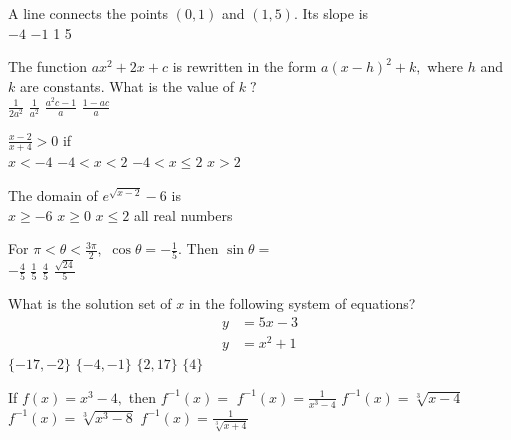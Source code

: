 \begin{question}
A line connects the points \((0, 1)\) and \((1, 5).\) Its slope is \\
\choicesline
{\(-4\)}
{\(-1\)}
{1}
{}
{5}
\end{question}

\begin{question}
The function \(ax^2 + 2x + c\) is rewritten in the form \(a(x - h)^2 + k,\) where \(h\) and \(k\) are constants. What is the value of \(k \; ?\) \\
\choicesline
{\(\frac{1}{2a^2}\)}
{\(\frac{1}{a^2}\)}
{}
{\(\frac{a^2 c - 1}{a}\)}
{\(\frac{1 - ac}{a}\)}
\end{question}

\begin{question}
\(\frac{x - 2}{x + 4} > 0\) if \\
\choices
{\(x < -4\)}
{\(-4 < x < 2\)}
{\(-4 < x \leqslant 2\)}
{\(x > 2\)}
{}    
\end{question}

\begin{question} 
The domain of \(e^{\sqrt{x - 2}} - 6\) is \\
\choices
{\(x \geqslant -6\)}
{\(x \geqslant 0\)}
{\(x \leqslant 2\)}
{}
{all real numbers}
\end{question} 

\begin{question} 
For \(\pi < \theta < \frac{3 \pi}{2},\) \(\cos \theta = -\frac{1}{5}.\) Then \(\sin \theta = \) \\
\choicesline
{}
{\(-\frac{4}{5}\)}
{\(\frac{1}{5}\)}
{\(\frac{4}{5}\)}
{\(\frac{\sqrt{24}}{5}\)}
\end{question} 

\begin{question}
What is the solution set of \(x\) in the following system of equations?
\[
\begin{aligned}
    y &= 5x - 3 \\
    y &= x^2 + 1
\end{aligned}
\]
\choices
{\(\{-17, -2\}\)}
{\(\{-4, -1\}\)}
{}
{\(\{2, 17\}\)}
{\(\{4\}\)}
\end{question}

\begin{question}
If \(f(x) = x^3 - 4,\) then \(f^{-1}(x) =\)
\choices
{}
{\(f^{-1}(x) = \frac{1}{x^3 - 4}\)}
{\(f^{-1}(x) = \sqrt[3]{x - 4}\)}
{\(f^{-1}(x) = \sqrt[3]{x^3 - 8}\)}
{\(f^{-1}(x) = \frac{1}{\sqrt[3]{x + 4}}\)}
\end{question}

